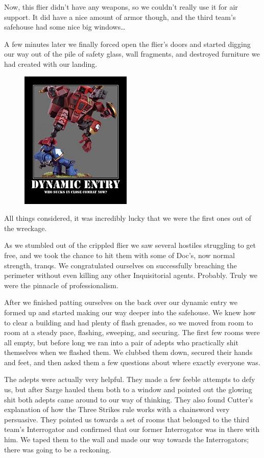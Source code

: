 Now, this flier didn’t have any weapons, so we couldn’t really use it for air support. 
It did have a nice amount of armor though, and the third team’s safehouse had some nice big windows…

A few minutes later we finally forced open the flier’s doors and started digging our way out of the pile of safety glass, wall fragments, and destroyed furniture we had created with our landing.

\begin{figure}
	\begin{center}
		\includegraphics[width=\figwidth]{pics/5/29.png}
	\end{center}
\end{figure}
All things considered, it was incredibly lucky that we were the first ones out of the wreckage. 

As we stumbled out of the crippled flier we saw several hostiles struggling to get free, and we took the chance to hit them with some of Doc’s, now normal strength, tranqs. 
We congratulated ourselves on successfully breaching the perimeter without even killing any other Inquisitorial agents. 
Probably. Truly we were the pinnacle of professionalism.

After we finished patting ourselves on the back over our dynamic entry we formed up and started making our way deeper into the safehouse. 
We knew how to clear a building and had plenty of flash grenades, so we moved from room to room at a steady pace, flashing, sweeping, and securing. 
The first few rooms were all empty, but before long we ran into a pair of adepts who practically shit themselves when we flashed them. 
We clubbed them down, secured their hands and feet, and then asked them a few questions about where exactly everyone was.

The adepts were actually very helpful. 
They made a few feeble attempts to defy us, but after Sarge hauled them both to a window and pointed out the glowing shit both adepts came around to our way of thinking. 
They also found Cutter’s explanation of how the Three Strikes rule works with a chainsword very persuasive. 
They pointed us towards a set of rooms that belonged to the third team’s Interrogator and confirmed that our former Interrogator was in there with him. 
We taped them to the wall and made our way towards the Interrogators; 
there was going to be a reckoning.

